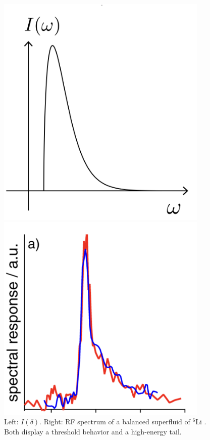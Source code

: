 \documentclass[prl,
twocolumn,
nofootinbib,
amsmath,amssymb,
aps]{revtex4-1}
\begin{document}
\begin{figure}[!htb]
\begin{minipage}{0.23\textwidth}
\includegraphics[width=0.9\textwidth]{figures/rf_spectrum_theory.png}
\end{minipage}
\begin{minipage}{0.23\textwidth}
\includegraphics[width=0.9\textwidth]{figures/rf_spectrum_experiment.png}
\end{minipage}
\caption{\label{fig:gap} Left: $I(\delta)$. Right: RF spectrum of a balanced superfluid of $^6$Li \cite{schirotzek2008determination}. Both display a threshold behavior and a high-energy tail.}
\end{figure}
\end{document}
